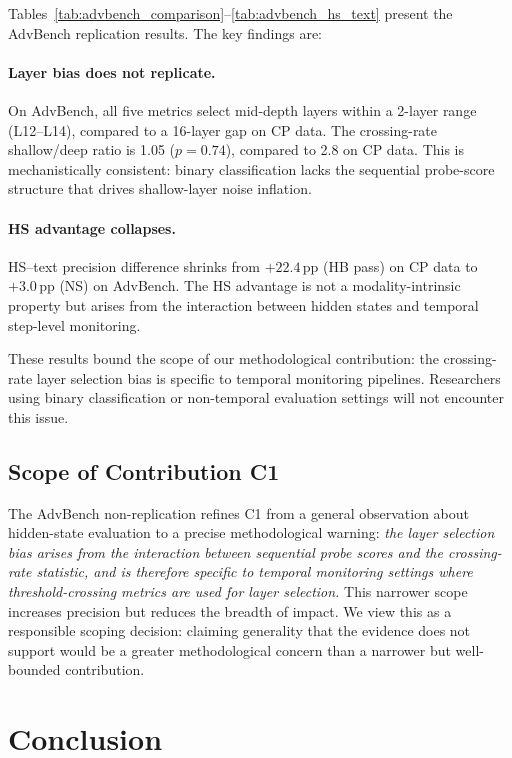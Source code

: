 \documentclass[11pt]{article}
\newcommand{\pp}{\,\text{pp}}
\begin{document}
Tables~\ref{tab:advbench_comparison}--\ref{tab:advbench_hs_text} present the AdvBench replication results.
The key findings are:

\paragraph{Layer bias does not replicate.}
On AdvBench, all five metrics select mid-depth layers within a 2-layer range (L12--L14), compared to a 16-layer gap on CP data.
The crossing-rate shallow/deep ratio is 1.05 ($p = 0.74$), compared to 2.8 on CP data.
This is mechanistically consistent: binary classification lacks the sequential probe-score structure that drives shallow-layer noise inflation.

\paragraph{HS advantage collapses.}
HS--text precision difference shrinks from $+22.4\pp$ (HB pass) on CP data to $+3.0\pp$ (NS) on AdvBench.
The HS advantage is not a modality-intrinsic property but arises from the interaction between hidden states and temporal step-level monitoring.

These results bound the scope of our methodological contribution: the crossing-rate layer selection bias is specific to temporal monitoring pipelines.
Researchers using binary classification or non-temporal evaluation settings will not encounter this issue.

\subsection{Scope of Contribution C1}

The AdvBench non-replication refines C1 from a general observation about hidden-state evaluation to a precise methodological warning:
\emph{the layer selection bias arises from the interaction between sequential probe scores and the crossing-rate statistic, and is therefore specific to temporal monitoring settings where threshold-crossing metrics are used for layer selection.}
This narrower scope increases precision but reduces the breadth of impact.
We view this as a responsible scoping decision: claiming generality that the evidence does not support would be a greater methodological concern than a narrower but well-bounded contribution.

\section{Conclusion}
\label{sec:conclusion}
\end{document}
